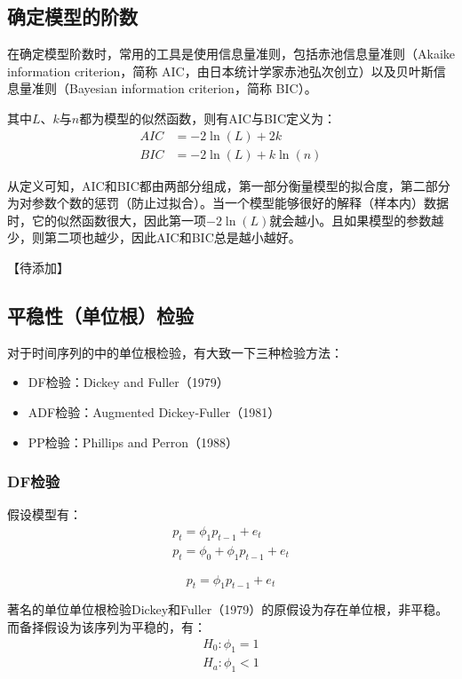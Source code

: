 \documentclass[11pt]{article}
\begin{document}
\subsection{确定模型的阶数}

在确定模型阶数时，常用的工具是使用信息量准则，包括赤池信息量准则（Akaike information criterion，简称 AIC，由日本统计学家赤池弘次创立）以及贝叶斯信息量准则（Bayesian information criterion，简称 BIC）。

其中$L$、$k$与$n$都为模型的似然函数，则有AIC与BIC定义为：
\begin{align*}
    AIC &= -2 \ln(L) + 2k \\
    BIC &= -2 \ln(L) + k\ln(n)
\end{align*}

从定义可知，AIC和BIC都由两部分组成，第一部分衡量模型的拟合度，第二部分为对参数个数的惩罚（防止过拟合）。当一个模型能够很好的解释（样本内）数据时，它的似然函数很大，因此第一项$-2\ln(L)$就会越小。且如果模型的参数越少，则第二项也越少，因此AIC和BIC总是越小越好。

【待添加】

\subsection{平稳性（单位根）检验}

对于时间序列的中的单位根检验，有大致一下三种检验方法：
\begin{itemize}
    \item DF检验：Dickey and Fuller（1979）
    \item ADF检验：Augmented Dickey-Fuller（1981）
    \item PP检验：Phillips and Perron（1988）
\end{itemize}

\subsubsection{DF检验}

假设模型有：
\begin{gather*}
    p_t = \phi_1 p_{t-1} + e_t \\
    p_t = \phi_0 + \phi_1 p_{t-1} + e_t
\end{gather*}

\begin{equation*}
    p_t = \phi_1 p_{t-1} + e_t
\end{equation*}

著名的单位单位根检验Dickey和Fuller（1979）的原假设为存在单位根，非平稳。而备择假设为该序列为平稳的，有：
\begin{gather*}
    H_0: \phi_1 = 1 \\
    H_a: \phi_1 < 1
\end{gather*}
\end{document}
